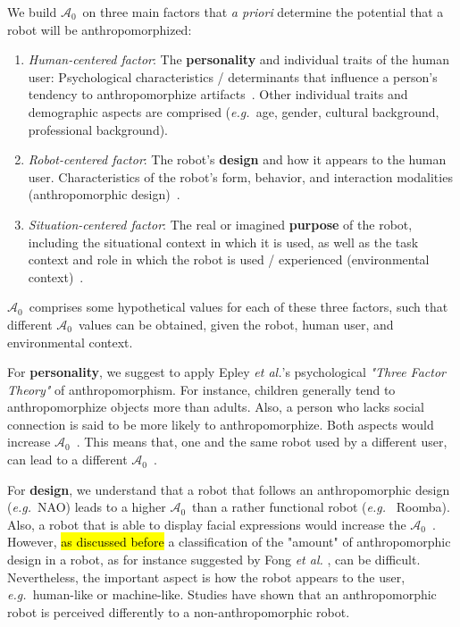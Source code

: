 \documentclass{frontiersSCNS} %
\newcommand{\eg}{{\textit{e.g.~}}}
\newcommand{\ICA}{{$\mathcal{A}_0$~}}
\begin{document}
We build \ICA on three main factors that \emph{a priori} determine the
potential that a robot will be anthropomorphized:

\begin{enumerate}

    \item \emph{Human-centered factor}: The \textbf{personality} and individual
        traits of the human user: Psychological characteristics / determinants
        that influence a person's tendency to anthropomorphize
        artifacts~\cite{epley_seeing_2007}. Other individual traits and
        demographic aspects are comprised (\eg age, gender, cultural background,
        professional background).

    \item \emph{Robot-centered factor}: The robot's \textbf{design} and how it
        appears to the human user. Characteristics of the robot's form,
        behavior, and interaction modalities (anthropomorphic
        design)~\cite{fong_survey_2003}.

    \item \emph{Situation-centered factor}: The real or imagined
        \textbf{purpose} of the robot, including the situational context in
        which it is used, as well as the task context and role in which the
        robot is used / experienced (environmental
        context)~\cite{joosse_what_2013}.

\end{enumerate}	

\ICA comprises some hypothetical values for each of these three factors, such
that different \ICA values can be obtained, given the robot, human user, and
environmental context.

For \textbf{personality}, we suggest to apply Epley \textit{et al.}'s
\cite{epley_seeing_2007} psychological \textit{"Three Factor Theory"} of
anthropomorphism. For instance, children generally tend to anthropomorphize
objects more than adults. Also, a person who lacks social connection is said to
be more likely to anthropomorphize. Both aspects would increase \ICA. This
means that, one and the same robot used by a different user, can lead to a
different \ICA.

For \textbf{design}, we understand that a robot that follows an anthropomorphic
design (\eg NAO) leads to a higher \ICA than a rather functional robot (\eg
Roomba). Also, a robot that is able to display facial expressions would increase
the \ICA. However, \hl{as discussed before} a classification of the "amount" of
anthropomorphic design in a robot, as for instance suggested by Fong \textit{et
al.} \cite{fong_survey_2003}, can be difficult. Nevertheless, the important
aspect is how the robot appears to the user, \eg human-like or machine-like.
Studies have shown that an anthropomorphic robot is perceived differently to a
non-anthropomorphic robot.
\end{document}
